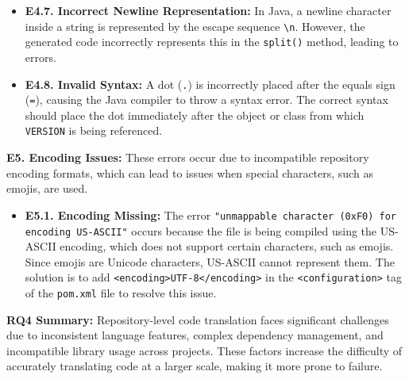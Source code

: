 \begin{itemize}[left=10pt]
    \item \textbf{E4.7. Incorrect Newline Representation:}  
    In Java, a newline character inside a string is represented by the escape sequence \texttt{\textbackslash n}. However, the generated code incorrectly represents this in the \texttt{split()} method, leading to errors.
    
    \item \textbf{E4.8. Invalid Syntax:}  
    A dot (\texttt{.}) is incorrectly placed after the equals sign (\texttt{=}), causing the Java compiler to throw a syntax error. The correct syntax should place the dot immediately after the object or class from which \texttt{VERSION} is being referenced.
\end{itemize}

\textbf{E5. Encoding Issues:}
These errors occur due to incompatible repository encoding formats, which can lead to issues when special characters, such as emojis, are used.

\begin{itemize}[left=10pt]
    \item \textbf{E5.1. Encoding Missing:}  
    The error \texttt{"unmappable character (0xF0) for encoding US-ASCII"} occurs because the file is being compiled using the US-ASCII encoding, which does not support certain characters, such as emojis. Since emojis are Unicode characters, US-ASCII cannot represent them. The solution is to add \texttt{<encoding>UTF-8</encoding>} in the \texttt{<configuration>} tag of the \texttt{pom.xml} file to resolve this issue.
\end{itemize}

\begin{center}
    \begin{myboxc} \textbf{RQ4 Summary: } %
    Repository-level code translation faces significant challenges due to inconsistent language features, complex dependency management, and incompatible library usage across projects. These factors increase the difficulty of accurately translating code at a larger scale, making it more prone to failure.
    \end{myboxc} %
\end{center}



